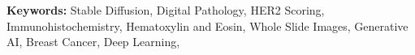 \begin{abstracts}
\textbf{Keywords:} Stable Diffusion, Digital Pathology, HER2 Scoring, Immunohistochemistry, Hematoxylin and Eosin, Whole Slide Images, Generative AI, Breast Cancer, Deep Learning,



\end{abstracts}



